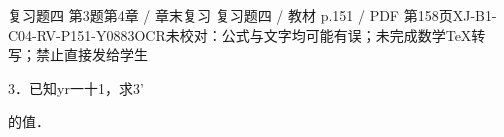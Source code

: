 \begin{bankitem}{复习题四 第3题}{第4章 / 章末复习 复习题四 / 教材 p.151 / PDF 第158页}{XJ-B1-C04-RV-P151-Y0883}{OCR未校对：公式与文字均可能有误；未完成数学TeX转写；禁止直接发给学生}
\begin{ocrdraft}
\par
3．已知yr一十1，求3'
\par
的值．
\end{ocrdraft}
\end{bankitem}
